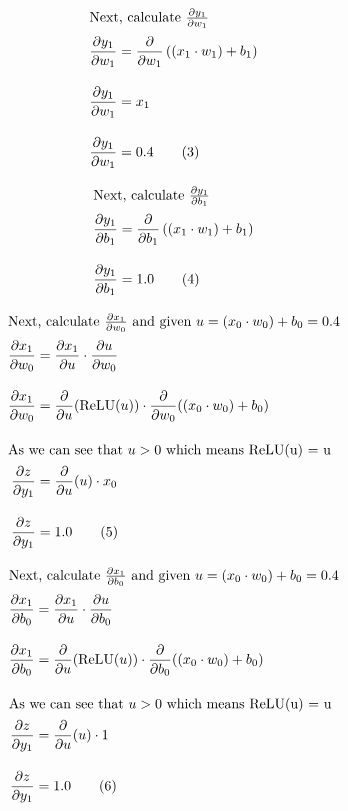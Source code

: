 \documentclass[12pt, a4paper]{article}
\begin{document}
                \begin{align*}
                    \intertext{Next, calculate $\frac{\partial {y}_{1}}{\partial {w}_{1}}$}
                    \frac{\partial {y}_{1}}{\partial {w}_{1}} &= \frac{\partial}{\partial {w}_{1}} \left( ({x}_{1} \cdot {w}_{1}) + {b}_{1} \right) \\[1em]
                    \frac{\partial {y}_{1}}{\partial {w}_{1}} &= {x}_{1} \\[1em]
                    \frac{\partial {y}_{1}}{\partial {w}_{1}} &= 0.4 \tag{3}
                \end{align*}

                \begin{align*}
                    \intertext{Next, calculate $\frac{\partial {y}_{1}}{\partial {b}_{1}}$}
                    \frac{\partial {y}_{1}}{\partial {b}_{1}} &= \frac{\partial}{\partial {b}_{1}} \left( ({x}_{1} \cdot {w}_{1}) + {b}_{1} \right) \\[1em]
                    \frac{\partial {y}_{1}}{\partial {b}_{1}} &= 1.0 \tag{4}
                \end{align*}

                \begin{align*}
                    \intertext{Next, calculate $\frac{\partial {x}_{1}}{\partial {w}_{0}}$ and given $u = ({x}_{0} \cdot {w}_{0}) + {b}_{0} = 0.4$}
                    \frac{\partial {x}_{1}}{\partial {w}_{0}} &= \frac{\partial {x}_{1}}{\partial u} \cdot \frac{\partial u}{\partial {w}_{0}} \\[1em]
                    \frac{\partial {x}_{1}}{\partial {w}_{0}} &= \frac{\partial}{\partial u}(\text{ReLU}(u)) \cdot \frac{\partial}{\partial {w}_{0}}(({x}_{0} \cdot {w}_{0}) + {b}_{0}) \\[1em]
                    \intertext{As we can see that $u > 0$ which means ReLU(u) = u}
                    \frac{\partial z}{\partial {y}_{1}} &= \frac{\partial}{\partial u}(u) \cdot {x}_{0} \\[1em]
                    \frac{\partial z}{\partial {y}_{1}} &= 1.0 \tag{5}
                \end{align*}

                \begin{align*}
                    \intertext{Next, calculate $\frac{\partial {x}_{1}}{\partial {b}_{0}}$ and given $u = ({x}_{0} \cdot {w}_{0}) + {b}_{0} = 0.4$}
                    \frac{\partial {x}_{1}}{\partial {b}_{0}} &= \frac{\partial {x}_{1}}{\partial u} \cdot \frac{\partial u}{\partial {b}_{0}} \\[1em]
                    \frac{\partial {x}_{1}}{\partial {b}_{0}} &= \frac{\partial}{\partial u}(\text{ReLU}(u)) \cdot \frac{\partial}{\partial {b}_{0}}(({x}_{0} \cdot {w}_{0}) + {b}_{0}) \\[1em]
                    \intertext{As we can see that $u > 0$ which means ReLU(u) = u}
                    \frac{\partial z}{\partial {y}_{1}} &= \frac{\partial}{\partial u}(u) \cdot 1 \\[1em]
                    \frac{\partial z}{\partial {y}_{1}} &= 1.0 \tag{6}
                \end{align*}
\end{document}
